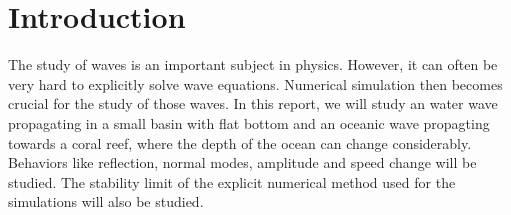 \section{Introduction}

The study of waves is an important subject in physics. However, it can often be very hard to explicitly solve wave equations. Numerical simulation then becomes crucial for the study of those waves. In this report, we will study an water wave propagating in a small basin with flat bottom and an oceanic wave propagting towards a coral reef, where the depth of the ocean can change considerably. Behaviors like reflection, normal modes, amplitude and speed change will be studied. The stability limit of the explicit numerical method used for the simulations will also be studied.

